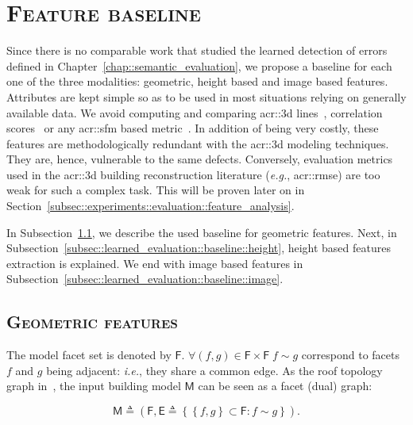 \section{\textsc{Feature baseline}}
    \label{sec::learned_evaluation::baseline}
    Since there is no comparable work that studied the learned detection of errors defined in Chapter~\ref{chap::semantic_evaluation}, we propose a baseline for each one of the three modalities: geometric, height based and image based features.
    Attributes are kept simple so as to be used in most situations relying on generally available data.
    We avoid computing and comparing \gls{acr::3d} lines~\parencite{michelin2013quality}, correlation scores~\parencite{boudet2006supervised} or any \gls{acr::sfm} based metric~\parencite{kowdle2011active}.
    In addition of being very costly, these features are methodologically redundant with the \gls{acr::3d} modeling techniques.
    They are, hence, vulnerable to the same defects.
    Conversely, evaluation metrics used in the \gls{acr::3d} building reconstruction literature (\textit{e.g.}, \gls{acr::rmse}) are too weak for such a complex task.
    This will be proven later on in Section~\ref{subsec::experiments::evaluation::feature_analysis}.

    In Subsection~\ref{subsec::learned_evaluation::baseline::geometric}, we describe the used baseline for geometric features.
    Next, in Subsection~\ref{subsec::learned_evaluation::baseline::height}, height based features extraction is explained.
    We end with image based features in Subsection~\ref{subsec::learned_evaluation::baseline::image}.

    \subsection{\textsc{Geometric features}}
        \label{subsec::learned_evaluation::baseline::geometric}
        The model facet set is denoted by $\mathsf{F}$.
        $\forall (f, g) \in \mathsf{F} \times \mathsf{F} \; f \sim g$ correspond to facets $f$ and $g$ being adjacent: 
        \textit{i.e.}, they share a common edge. As the roof topology graph in~\parencite{verma20063d}, the input building model $\mathsf{M}$ can be seen as a facet (dual) graph:

        \begin{equation}
        	\label{eq::model_graph}
        	\mathsf{M} \triangleq \left(\mathsf{F}, \mathsf{E} \triangleq \left\{ \left\{f, g\right\} \subset \mathsf{F} : f \sim g \right\} \right).
        \end{equation}

